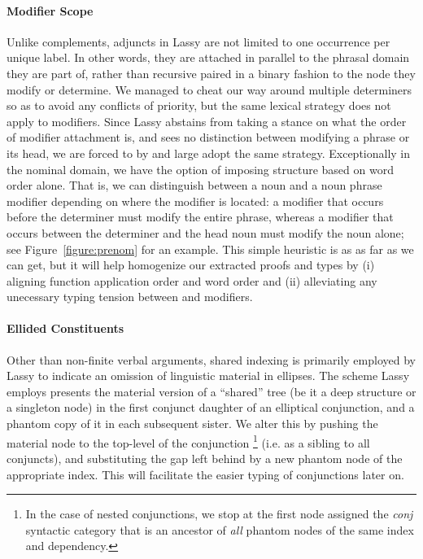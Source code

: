 \paragraph{Modifier Scope}
Unlike complements, adjuncts in Lassy are not limited to one occurrence per unique label.
In other words, they are attached in parallel to the phrasal domain they are part of, rather than recursive paired in a binary fashion to the node they modify or determine.
We managed to cheat our way around multiple determiners so as to avoid any conflicts of priority, but the same lexical strategy does not apply to modifiers.
Since Lassy abstains from taking a stance on what the order of modifier attachment is, and sees no distinction between modifying a phrase or its head, we are forced to by and large adopt the same strategy.
Exceptionally in the nominal domain, we have the option of imposing structure based on word order alone.
That is, we can distinguish between a noun and a noun phrase modifier depending on where the modifier is located: a modifier that occurs before the determiner must modify the entire phrase, whereas a modifier that occurs between the determiner and the head noun must modify the noun alone; see Figure~\ref{figure:prenom} for an example.
This simple heuristic is as as far as we can get, but it will help homogenize our extracted proofs and types by (i) aligning function application order and word order and (ii) alleviating any unecessary typing tension between  and  modifiers.

\paragraph{Ellided Constituents}
Other than non-finite verbal arguments, shared indexing is primarily employed by Lassy to indicate an omission of linguistic material in ellipses.
The scheme Lassy employs presents the material version of a ``shared'' tree (be it a deep structure or a singleton node) in the first conjunct daughter of an elliptical conjunction, and a phantom copy of it in each subsequent sister.
We alter this by pushing the material node to the top-level of the conjunction%
		\footnote{In the case of nested conjunctions, we stop at the first node assigned the \textit{conj} syntactic category that is an ancestor of \textit{all} phantom nodes of the same index and dependency.}
(i.e. as a sibling to all conjuncts), and substituting the gap left behind by a new phantom node of the appropriate index.
This will facilitate the easier typing of conjunctions later on.

